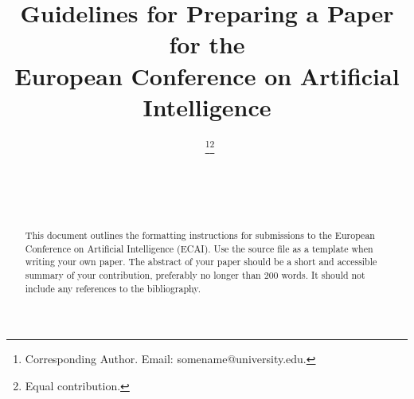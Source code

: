 \documentclass{ecai}
\begin{document}

\begin{frontmatter}




\title{Guidelines for Preparing a Paper for the \\
European Conference on Artificial Intelligence}


\author[A]{~\thanks{Corresponding Author. Email: somename@university.edu.}\footnote{Equal contribution.}}
\author[B]{~\footnotemark}
\author[B,C]{~}

\address[A]{Short Affiliation of First Author}
\address[B]{Short Affiliation of Second Author and Third Author}
\address[C]{Short Alternate Affiliation of Third Author}


\begin{abstract}
This document outlines the formatting instructions for submissions to
the European Conference on Artificial Intelligence (ECAI).
Use the source file as a template when writing your own paper.
The abstract of your paper should be a short and accessible summary
of your contribution, preferably no longer than 200 words.
It should not include any references to the bibliography.
\end{abstract}

\end{frontmatter}
\end{document}
